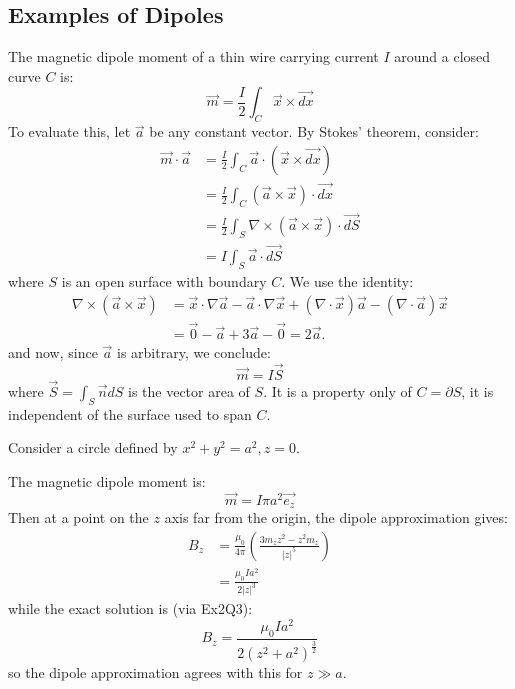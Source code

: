 \documentclass[../Main.tex]{subfiles}
\begin{document}
\subsection{Examples of Dipoles}
The magnetic dipole moment of a thin wire carrying current $I$ around a closed curve $C$ is:
\begin{equation*}
    \vec{m} = \frac{I}{2} \int_C \vec{x} \times \vec{dx}
\end{equation*}
To evaluate this, let $\vec{a}$ be any constant vector. By Stokes' theorem, consider:
\begin{align*}
    \vec{m} \cdot \vec{a} &= \frac{I}{2} \int_C\vec{a} \cdot (\vec{x} \times \vec{dx}) \\
    &= \frac{I}{2} \int_C (\vec{a} \times \vec{x}) \cdot \vec{dx} \\
    &= \frac{I}{2} \int_S \nabla \times (\vec{a} \times \vec{x}) \cdot \vec{dS} \\
    &= I \int_S \vec{a} \cdot \vec{dS}
\end{align*}
where $S$ is an open surface with boundary $C$. We use the identity:
\begin{align*}
    \nabla \times (\vec{a} \times \vec{x}) &= \vec{x} \cdot \nabla \vec{a} - \vec{a} \cdot \nabla \vec{x} + (\nabla \cdot \vec{x}) \vec{a} - (\nabla \cdot \vec{a}) \vec{x} \\
    &= \vec0 - \vec{a} + 3\vec{a} - \vec0 = 2\vec{a}.
\end{align*}
and now, since $\vec{a}$ is arbitrary, we conclude:
\begin{equation*}
    \vec{m} = I \vec{S}
\end{equation*}
where $\vec{S} = \int_S \vec{n} dS$ is the vector area of $S$. It is a property only of $C = \partial S$, it is independent of the surface used to span $C$.
\begin{example}
    Consider a circle defined by $x^2 + y^2 = a^2, z = 0$.

    The magnetic dipole moment is:
    \begin{equation*}
        \vec{m} = I \pi a^2 \vec{e_z}
    \end{equation*}
    Then at a point on the $z$ axis far from the origin, the dipole approximation gives:
    \begin{align*}
        B_z &= \frac{\mu_0}{4\pi} \left(\frac{3m_z z^2 - z^2 m_z}{|z|^5}\right) \\
        &= \frac{\mu_0 I a^2}{2|z|^3}
    \end{align*}
    while the exact solution is (via Ex2Q3):
    \begin{equation*}
        B_z = \frac{\mu_0 I a^2}{2(z^2 + a^2)^{\frac32}}
    \end{equation*}
    so the dipole approximation agrees with this for $z \gg a$.
\end{example}
\end{document}
